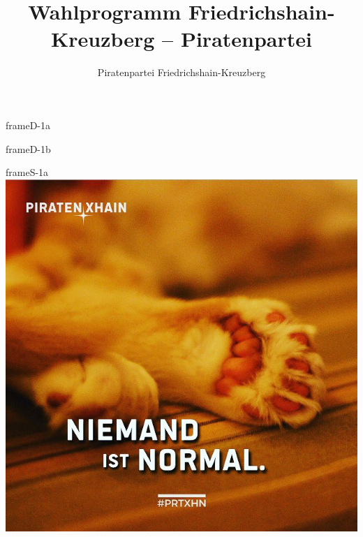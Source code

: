 \documentclass[a4paper,10pt]{article}
\title{Wahlprogramm Friedrichshain-Kreuzberg -- Piratenpartei}
\author{Piratenpartei Friedrichshain-Kreuzberg}
\date{\relax}
\begin{document}
\pagestyle{empty}
\sloppy 

\begin{dynamiccontents*}{frameD-1a}
\end{dynamiccontents*}

\begin{dynamiccontents*}{frameD-1b}
\end{dynamiccontents*}


\begin{staticcontents*}{frameS-1a}
\includegraphics[viewport = {0cm 0cm 21cm 16cm}, clip]{images/blog/large/niemandistnormal.jpg}
\end{staticcontents*}
\end{document}
